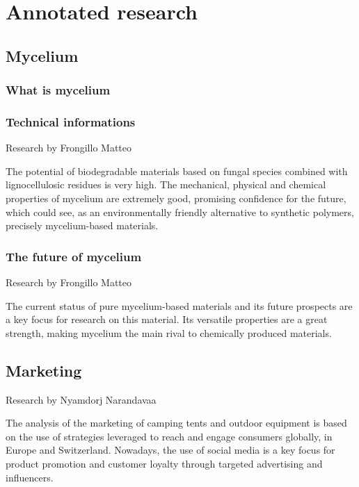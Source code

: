 \documentclass{article}
\begin{document}
\tableofcontents
\thispagestyle{empty}

\newpage
\section{Annotated research}
\subsection{Mycelium}
\subsubsection{What is mycelium}
\subsubsection{Technical informations}
{\small Research by Frongillo Matteo}

The potential of biodegradable materials based on fungal species combined with
lignocellulosic residues is very high. The mechanical, physical and chemical
properties of mycelium are extremely good, promising confidence for the future, which
could see, as an environmentally friendly alternative to synthetic polymers, precisely
mycelium-based materials.\\


\subsubsection{The future of mycelium}
{\small Research by Frongillo Matteo}

The current status of pure mycelium-based materials and its future prospects are a key
focus for research on this material. Its versatile properties are a great strength, making
mycelium the main rival to chemically produced materials.\\


\subsection{Marketing}
{\small Research by Nyamdorj Narandavaa}

The analysis of the marketing of camping tents and outdoor equipment is based on the use
of strategies leveraged to reach and engage consumers globally, in Europe and Switzerland.
Nowadays, the use of social media is a key focus for product promotion and customer
loyalty through targeted advertising and influencers.
\end{document}
